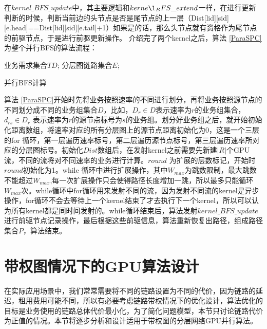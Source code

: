 在$kernel\_BFS\_update$中，其主要逻辑和$kerne\l_BFS\_extend$一样，在进行更新判断的时候，判断当前边的头节点是否是尾节点的上一层（Dist[lid][sid][e.head]==Dist[lid][sid][e.tail]+1）如果是的话，那么头节点就有资格作为尾节点的前驱节点，于是进行前驱更新操作。
介绍完了两个kernel之后，算法 \ref{ParaSPC}为整个并行BFS的算法流程：
\begin{algorithm}[t]
\begin{algorithmic}[1]
\Require
业务需求集合$TD$;
分层图链路集合$E$;
\Else
{}
\EndIf
{}
\EndFor
\EndFor
\EndFor
\EndFor
{}
\EndFor
{}
\EndWhile
{}
\EndFor
{}
\end{algorithmic}
\caption{{并行BFS计算}}
\label{ParaSPC}
\end{algorithm}
算法 \ref{ParaSPC}开始时先将业务按照速率的不同进行划分，再将业务按照源节点的不同划分成不同的业务组集合$D$，比如，$D_r \in D$表示速率为$r$的业务组集合，$d_{rs} \in D_r$ 表示速率为$r$的源节点标号为$s$的业务组。划分好业务组之后，就开始初始化距离数组，将速率对应的所有分层图上的源节点距离初始化为0，这是一个三层的for 循环，第一层遍历速率标号，第二层遍历源节点标号，第三层遍历速率所对应的分层图标号。初始化$Dist$数组后，在发射kernel之前需要先新建$|R|$个GPU流，不同的流将对不同速率的业务进行计算。$round$ 为扩展的层数标记，开始时$round$初始化为1。while 循环中进行扩展操作，其中$W_{max}$为跳数限制，最大跳数不能超过$W_{max}$,每一次扩展操作只会使得路径长度增加一跳，所以最多只能循环$W_{max}$次。while循环中for循环用来发射不同的流，因为发射不同流的kernel是异步操作，for循环不会去等待上一个kernel结束了才去执行下一个kernel，所以可以认为所有kernel都是同时间发射的。while循环结束后，算法发射$kernel\_BFS\_update$进行前驱节点记录操作，最后根据这些前驱信息，算法重新恢复出路径，组成路径集合$P$，算法结束。
\section{带权图情况下的GPU算法设计}

在实际应用场景中，我们常常需要将不同的链路设置为不同的代价，因为链路的延迟，租用费用可能不同，所以有必要考虑链路带权情况下的优化设计，算法优化的目标是业务使用的链路总体代价最小化，为了简化问题模型，本节只讨论链路代价为正值的情况。本节将逐步分析和设计适用于带权图的分层网络GPU并行算法。
